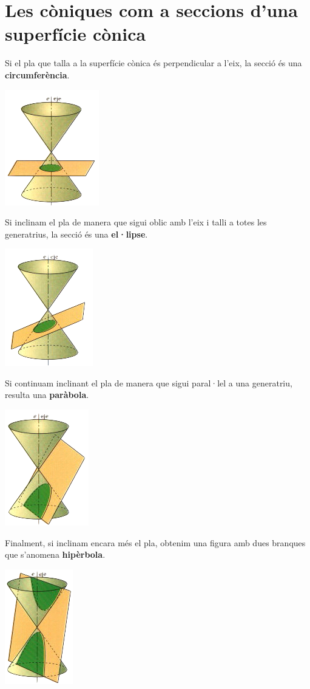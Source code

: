 \section{Les còniques com a seccions d'una superfície cònica}
\begin{theorybox}
\begin{multicols}{4}
	\scriptsize
	Si el pla que talla a la superfície cònica és perpendicular a l'eix, la secció és una \textbf{circumferència}.
		\begin{center}
	\includegraphics[height=3.cm]{img-10/circumferencia.png}
	\end{center}

	Si inclinam el pla de manera que sigui oblic amb l'eix i talli a totes les generatrius, la secció és una \textbf{el·lipse}.
		\begin{center}
		\includegraphics[height=3.cm]{img-10/ellipse.png}
	\end{center}

	Si continuam inclinant el pla de manera que sigui paral·lel a una generatriu, resulta una \textbf{paràbola}.
		\begin{center}
		\includegraphics[height=3.cm]{img-10/parabola.png}
\end{center}
		
	Finalment, si inclinam encara més el pla, obtenim una figura amb dues branques que s'anomena \textbf{hipèrbola}.
		\begin{center}
		\includegraphics[height=3.cm]{img-10/hiperbola.png}
	\end{center}

\end{multicols}	
\end{theorybox}



